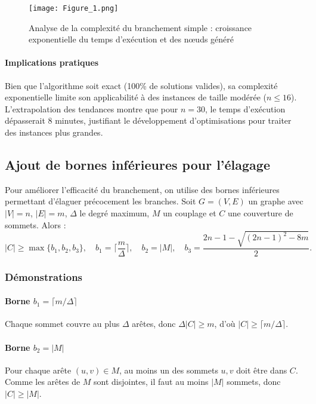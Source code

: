 \documentclass[11pt,a4paper]{article}
\begin{document}
\begin{figure}[H]
  \centering
  \texttt{[image: Figure\_1.png]}
  \caption{Analyse de la complexité du branchement simple : croissance exponentielle du temps d'exécution et des nœuds généré}
  \label{fig:branchtime}
\end{figure}

\paragraph{Implications pratiques}
Bien que l'algorithme soit exact (100\% de solutions valides), sa complexité exponentielle limite son applicabilité à des instances de taille modérée ($n \leq 16$). L'extrapolation des tendances montre que pour $n=30$, le temps d'exécution dépasserait 8 minutes, justifiant le développement d'optimisations pour traiter des instances plus grandes.

\subsection{Ajout de bornes inférieures pour l'élagage}

Pour améliorer l'efficacité du branchement, on utilise des bornes inférieures permettant d'élaguer précocement les branches. Soit $G=(V,E)$ un graphe avec $|V|=n$, $|E|=m$, $\Delta$ le degré maximum, $M$ un couplage et $C$ une couverture de sommets. Alors :
\[
|C|\ge \max\{b_1,b_2,b_3\},\quad 
b_1=\Big\lceil\frac{m}{\Delta}\Big\rceil,\quad 
b_2=|M|,\quad 
b_3=\frac{2n-1-\sqrt{(2n-1)^2-8m}}{2}.
\]

\subsubsection{Démonstrations}

\paragraph{Borne $b_1=\lceil m/\Delta\rceil$}
Chaque sommet couvre au plus $\Delta$ arêtes, donc $\Delta|C|\ge m$, d'où $|C|\ge \lceil m/\Delta\rceil$.

\paragraph{Borne $b_2=|M|$}
Pour chaque arête $(u,v)\in M$, au moins un des sommets $u,v$ doit être dans $C$. Comme les arêtes de $M$ sont disjointes, il faut au moins $|M|$ sommets, donc $|C|\ge |M|$.
\end{document}
